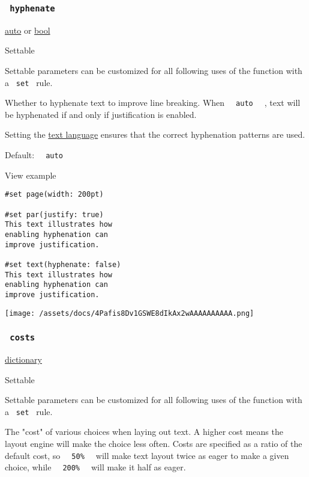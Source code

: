 \subsubsection{\texorpdfstring{\texttt{\ hyphenate\ }}{ hyphenate }}\label{parameters-hyphenate}

\href{/docs/reference/foundations/auto/}{auto} {or}
\href{/docs/reference/foundations/bool/}{bool}

{{ Settable }}

\label{parameters-hyphenate-settable-tooltip}
Settable parameters can be customized for all following uses of the
function with a \texttt{\ set\ } rule.

Whether to hyphenate text to improve line breaking. When
\texttt{\ }{\texttt{\ auto\ }}\texttt{\ } , text will be hyphenated if
and only if justification is enabled.

Setting the \href{/docs/reference/text/text/\#parameters-lang}{text
language} ensures that the correct hyphenation patterns are used.

Default: \texttt{\ }{\texttt{\ auto\ }}\texttt{\ }


View example

\begin{verbatim}
#set page(width: 200pt)

#set par(justify: true)
This text illustrates how
enabling hyphenation can
improve justification.

#set text(hyphenate: false)
This text illustrates how
enabling hyphenation can
improve justification.
\end{verbatim}

\texttt{[image: /assets/docs/4Pafis8Dv1GSWE8dIkAx2wAAAAAAAAAA.png]}

\subsubsection{\texorpdfstring{\texttt{\ costs\ }}{ costs }}\label{parameters-costs}

\href{/docs/reference/foundations/dictionary/}{dictionary}

{{ Settable }}

\label{parameters-costs-settable-tooltip}
Settable parameters can be customized for all following uses of the
function with a \texttt{\ set\ } rule.

The "cost" of various choices when laying out text. A higher cost means
the layout engine will make the choice less often. Costs are specified
as a ratio of the default cost, so
\texttt{\ }{\texttt{\ 50\%\ }}\texttt{\ } will make text layout twice as
eager to make a given choice, while
\texttt{\ }{\texttt{\ 200\%\ }}\texttt{\ } will make it half as eager.

